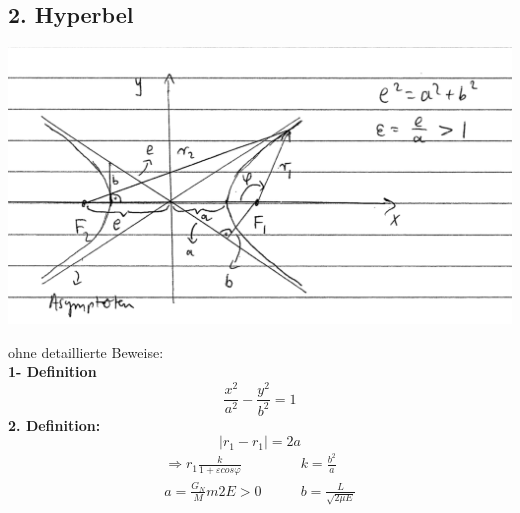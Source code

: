 \documentclass[11pt]{article}
\begin{document}
	\subsection{2. Hyperbel}
	\begin{center}
		\includegraphics[scale=0.5]{Hyperbelproblem.png}
	\end{center}
ohne detaillierte Beweise:\\
\textbf{1- Definition}\\
\[ \frac{x^2}{a^2} - \frac{y^2}{b^2} = 1 \]
\textbf{2. Definition:}\\
\[ |r_1 - r_1| = 2a \]
\begin{align*}
	\Rightarrow r_1 \frac{k}{1 + \varepsilon cos \varphi} &\qquad k = \frac{b^2}{a}\\
	a= \frac{G_N}Mm{2E} > 0&\qquad b = \frac{L}{\sqrt{2\mu E}} 
\end{align*}
\end{document}
